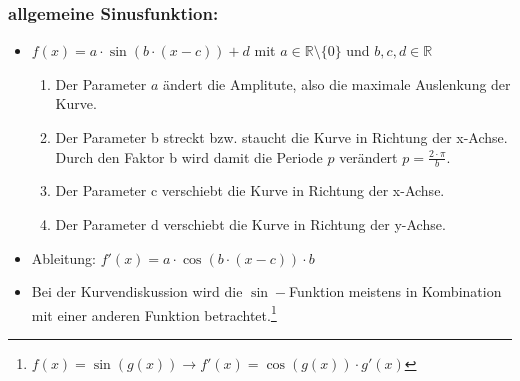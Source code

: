 \documentclass[a4paper,twocolumn,10pt]{onepgnote1}
\begin{document}
 \subsubsection{allgemeine Sinusfunktion:} 
 \begin{itemize}
 \item $ f(x)= a\cdot \sin{(b\cdot (x - c))}+d $ mit  $a\in \mathds{R}\setminus\{0\}$ und $b,c,d \in \mathds{R}$
 \begin{enumerate}
\item Der Parameter $a$ ändert die Amplitute, also die maximale Auslenkung der Kurve.\\
\item Der Parameter b streckt bzw. staucht die Kurve in Richtung der x-Achse. Durch den Faktor b wird damit die Periode $p$ verändert $p = \frac{2\cdot \pi}{b}$.\\
        \item Der Parameter c verschiebt die Kurve in Richtung der x-Achse.\\
        \item Der Parameter d verschiebt die Kurve in Richtung der y-Achse.
 \end{enumerate}
 \item Ableitung: $f'(x)=  a\cdot \cos{(b\cdot (x - c))}\cdot b $
 \item Bei der Kurvendiskussion wird die $\sin-$Funktion meistens in Kombination mit einer anderen Funktion betrachtet.\footnote{$f(x) = \sin{(g(x))}  \longrightarrow f'(x) = \cos{(g(x))}\cdot g'(x) $}
 \end{itemize}
\end{document}
